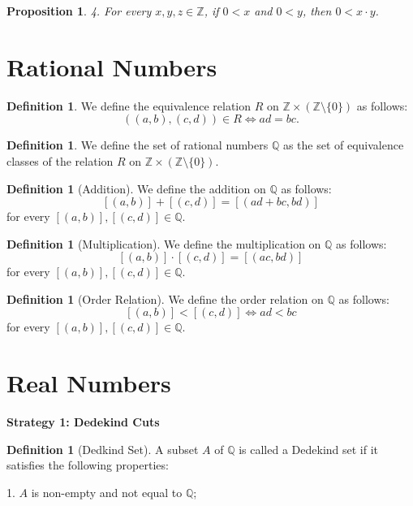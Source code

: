 \documentclass[12pt, reqno]{amsart}
\newtheorem{proposition}[theorem]{Proposition}
\theoremstyle{definition}
\newtheorem{definition}[theorem]{Definition}
\theoremstyle{remark}
\numberwithin{equation}{section}
\begin{document}
{\begin{proposition}
    4. For every $x, y, z \in \mathbb{Z}$, if $0 < x$ and $0 < y$, then $0 < x \cdot y$.
\end{proposition}

\section{Rational Numbers}

\begin{definition}
    We define the equivalence relation $R$ on $\mathbb{Z} \times (\mathbb{Z} \setminus \{0\})$ as follows:
    \[
        ((a, b), (c, d)) \in R \iff ad = bc.
    \]
\end{definition}

\begin{definition}
    We define the set of rational numbers $\mathbb{Q}$ as the set of equivalence classes of the relation $R$ on $\mathbb{Z} \times (\mathbb{Z} \setminus \{0\})$.
\end{definition}

\begin{definition}[Addition]
    We define the addition on $\mathbb{Q}$ as follows:
    \[
        [(a, b)] + [(c, d)] = [(ad + bc, bd)]
    \]
    for every $[(a, b)], [(c, d)] \in \mathbb{Q}$.
\end{definition}

\begin{definition}[Multiplication]
    We define the multiplication on $\mathbb{Q}$ as follows:
    \[
        [(a, b)] \cdot [(c, d)] = [(ac, bd)]
    \]
    for every $[(a, b)], [(c, d)] \in \mathbb{Q}$.
\end{definition}

\begin{definition}[Order Relation]
    We define the order relation on $\mathbb{Q}$ as follows:
    \[
        [(a, b)] < [(c, d)] \iff ad < bc
    \]
    for every $[(a, b)], [(c, d)] \in \mathbb{Q}$.
\end{definition}

\section{Real Numbers}

\textbf{Strategy 1: Dedekind Cuts}

\begin{definition}[Dedkind Set]
    A subset $A$ of $\mathbb{Q}$ is called a Dedekind set if it satisfies the following properties:

    1. $A$ is non-empty and not equal to $\mathbb{Q}$;


\end{definition}}
\end{document}
